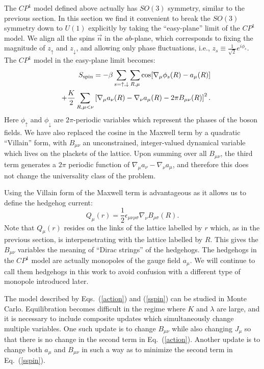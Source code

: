 \documentclass[prb,twocolumn]{revtex4-1}
\newcommand{\cp}{$CP^1$ }
\begin{document}
The \cp model defined above actually has $SO(3)$ symmetry, similar to the previous section. In this section we find it convenient to break the $SO(3)$ symmetry down to $U(1)$ explicitly by taking the ``easy-plane'' limit of the $CP^1$ model. We align all the spins $\vec{n}$ in the $ab$-plane, which corresponds to fixing the magnitude of $z_\uparrow$ and $z_\downarrow$, and allowing only phase fluctuations, i.e., $z_s\equiv \frac{1}{\sqrt{2}}e^{i\phi_s}$. The $CP^1$ model in the easy-plane limit becomes:
\begin{eqnarray}
&&S_{\rm spin}=-\beta\sum_{s=\uparrow,\downarrow}\sum_{R,\mu} \cos[\nabla_\mu\phi_s(R)-a_\mu(R)]\nonumber\\
&&+\frac{K}{2}\sum_{R,\mu<\nu}\left[\nabla_\mu a_\nu(R)-\nabla_\nu a_\mu(R)-2\pi B_{\mu\nu}(R)\right]^2.
\label{sspin}
\end{eqnarray}
Here $\phi_\uparrow$ and $\phi_\downarrow$ are $2\pi$-periodic variables which represent the phases of the boson fields. We have also replaced the cosine in the Maxwell term by a quadratic ``Villain'' form, with $B_{\mu\nu}$ an unconstrained, integer-valued dynamical variable which lives on the plackets of the lattice. Upon summing over all $B_{\mu\nu}$, the third term generates a $2\pi$ periodic function of $\nabla_\mu a_{\nu}-\nabla_\nu a_{\mu}$, and therefore this does not change the universality class of the problem.

Using the Villain form of the Maxwell term is advantageous as it allows us to define the hedgehog current:
\begin{equation}
Q_\mu(r)=\frac{1}{2}\epsilon_{\mu\nu\rho\sigma}\nabla_\nu B_{\rho\sigma}(R).
\label{mondef}
\end{equation}
Note that $Q_\mu(r)$ resides on the links of the lattice labelled by $r$ which, as in the previous section, is interpenetrating with the lattice labelled by $R$. This gives the $B_{\mu\nu}$ variables the meaning of ``Dirac strings'' of the hedgehogs. The hedgehogs in the \cp model are actually monopoles of the gauge field $a_\mu$. We will continue to call them hedgehogs in this work to avoid confusion with a different type of monopole introduced later.

The model described by  Eqs.~(\ref{action}) and (\ref{sspin}) can be studied in Monte Carlo. Equilibration becomes difficult in the regime where $K$ and $\lambda$ are large, and it is necessary to include composite updates which simultaneously change multiple variables. One such update is to change $B_{\mu\nu}$ while also changing $J_\mu$ so that there is no change in the second term in Eq.~(\ref{action}). Another update is to change both $a_\mu$ and $B_{\mu\nu}$ in such a way as to minimize the second term in Eq.~(\ref{sspin}). 
\end{document}
